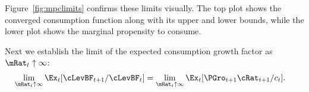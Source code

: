 \documentclass[BufferStockTheory]{subfiles}
\begin{document}
Figure~\ref{fig:mpclimits} confirms these limits visually.  The top
plot shows the converged consumption function along with its upper and lower bounds,
while the lower plot shows the marginal propensity to consume.
\renewcommand{\figFile}{mpclimits}
\hypertarget{\figFile}{}


\renewcommand{\figFile}{cFuncBounds}
\hypertarget{\figFile}{}



Next we establish the limit of the expected consumption growth factor
as $\mRat_{t} \uparrow \infty$:
\begin{align}
  \lim_{\mRat_{t} \uparrow \infty} \Ex_{t}[
  \cLevBF_{t+1}/\cLevBF_{t}]  & = \lim_{\mRat_{t} \uparrow \infty} \Ex_{t}[
                                {\PGro}_{t+1} {\cRat}_{t+1}/c_{t}]. \notag
\end{align}
\end{document}
